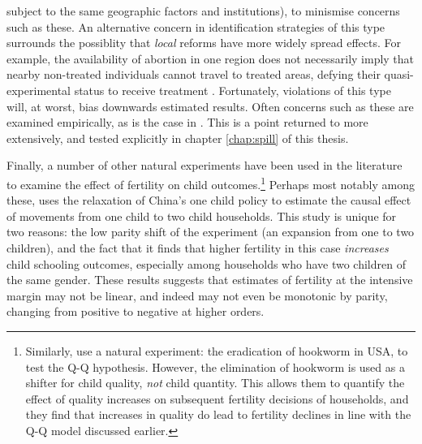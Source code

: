 subject to the same geographic factors and institutions), to minismise concerns 
such as these. An alternative concern in identification strategies of this type 
surrounds the possiblity that \emph{local} reforms have more widely spread
effects.  For example, the availability of abortion in one region does not
necessarily imply that nearby non-treated individuals cannot travel to
treated areas, defying their quasi-experimental status to receive treatment 
\citep{Levineetal1999}. Fortunately, violations of this type will, at worst, 
bias downwards estimated results. Often concerns such as these are examined
empirically, as is the case in \citet{Christensen2012}.  This is a point 
returned to more extensively, and tested explicitly in chapter 
\ref{chap:spill} of this thesis.

Finally, a number of other natural experiments have been used in the 
literature to examine the effect of fertility on child outcomes.\footnote{
Similarly, \citet{BleakleyLange2009} use a natural experiment: the eradication
of hookworm in USA, to test the Q-Q hypothesis.  However, the elimination of
hookworm is used as a shifter for child quality, \emph{not} child quantity.
This allows them to quantify the effect of quality increases on subsequent
fertility decisions of households, and they find that increases in quality
do lead to fertility declines in line with the Q-Q model discussed earlier.}
Perhaps most notably among these, \citet{Qian2009} uses the relaxation of 
China's one child policy to estimate the causal effect of movements from one 
child to two child households.  This study is unique for two reasons: the low 
parity shift of the experiment (an expansion from one to two children), and the 
fact that it finds that higher fertility in this case \emph{increases} child 
schooling outcomes, especially among households who have two children of the 
same gender. These results suggests that estimates of fertility at the intensive 
margin may not be linear, and indeed may not even be monotonic by parity, 
changing from positive to negative at higher orders.

